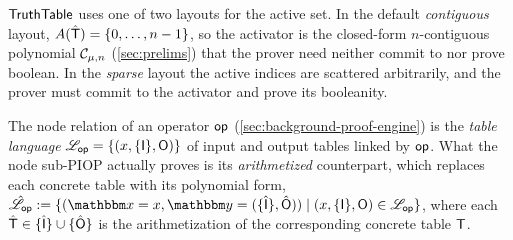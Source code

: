 $\mathsf{TruthTable}$ uses one of two layouts for the active set. In the default \emph{contiguous} layout, $A(\hat{\mathsf{T}}) = \{0, \dots, n - 1\}$, so the activator is the closed-form $n$-contiguous polynomial $\mathcal{C}_{\mu,n}$ (\cref{sec:prelims}) that the prover need neither commit to nor prove boolean. In the \emph{sparse} layout the active indices are scattered arbitrarily, and the prover must commit to the activator and prove its booleanity.


The node relation of an operator $\mathsf{op}$ (\cref{sec:background-proof-engine}) is the \emph{table language}
$\mathscr{L}_{\mathsf{op}} = \{(x, \{{\mathsf{I}}\}, {\mathsf{O}})\}$ of input and output tables linked by $\mathsf{op}$. What the node sub-PIOP actually proves is its \emph{arithmetized} counterpart, which replaces each concrete table with its polynomial form, $
\hat{\NPLanguage}_{\op} := \{
    (\NPInstance = x,
    \NPInstancey = (\{\hat{\TableIn}\}, \hat{\TableOut}))
  \;|\;
  (x, \{\TableIn\}, \TableOut) \in \Language{\op}
\}
$,
where each $\hat{\mathsf{T}} \in \{\hat{{\mathsf{I}}}\} \cup \{\hat{{\mathsf{O}}}\}$ is the arithmetization of the corresponding concrete table $\mathsf{T}$.
